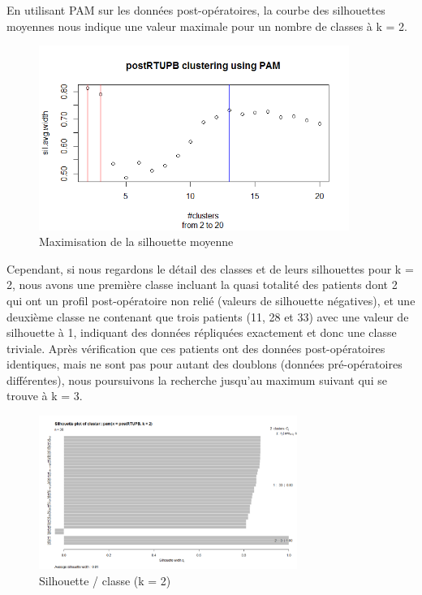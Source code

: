 %
%

En utilisant PAM sur les données post-opératoires, la courbe des silhouettes moyennes
nous indique une valeur maximale pour un nombre de classes à k = 2.

\begin{figure}[H]
\centering
\includegraphics[width=0.90\textwidth]{../Fig/RTUPB/rtupb-elbow-post.png}
\caption{Maximisation de la silhouette moyenne }
\end{figure}

Cependant, si nous regardons le détail des classes et de leurs silhouettes pour k = 2,
nous avons une première classe incluant la quasi totalité des patients dont 2 qui ont un profil post-opératoire non relié (valeurs de silhouette négatives), et une deuxième classe ne contenant que trois patients (11, 28 et 33)
avec une valeur de silhouette à 1, indiquant des données répliquées exactement et donc une classe triviale.
Après vérification que ces patients ont des données post-opératoires identiques, mais ne sont pas pour autant
des doublons (données pré-opératoires différentes), nous poursuivons la recherche jusqu'au maximum suivant qui se trouve à k = 3.

\begin{figure}[H]
\centering
\includegraphics[width=0.75\textwidth]{../Fig/RTUPB/rtupb-sil-k2-post.png}
\caption{Silhouette / classe (k = 2) }
\end{figure}

